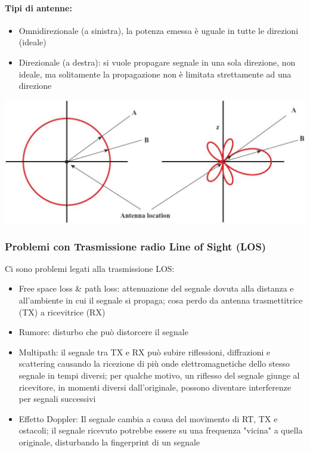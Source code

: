 \paragraph{Tipi di antenne:}
\begin{itemize}
	\item Omnidirezionale (a sinistra), la potenza emessa è uguale in tutte le direzioni (ideale)
	\item Direzionale (a destra): si vuole propagare segnale in una sola direzione, non ideale, ma solitamente la propagazione non è limitata strettamente ad una direzione
\end{itemize}
\begin{center}
	\includegraphics[width=0.9\linewidth]{img/wireless/antenna}
\end{center}

\newpage

\subsubsection{Problemi con Trasmissione radio Line of Sight (LOS)}

Ci sono problemi legati alla trasmissione LOS:
\begin{itemize}
	\item Free space loss \& path loss: attenuazione del segnale dovuta alla distanza e all'ambiente in cui il segnale si propaga; cosa perdo da antenna trasmettitrice (TX) a ricevitrice (RX)
	\item Rumore: disturbo che può distorcere il segnale
	\item Multipath: il segnale tra TX e RX può subire riflessioni, diffrazioni e scattering causando la ricezione di più onde elettromagnetiche dello stesso segnale in tempi diversi; per qualche motivo, un riflesso del segnale giunge al ricevitore, in momenti diversi dall'originale, possono diventare interferenze per segnali successivi
	\item Effetto Doppler: Il segnale cambia a causa del movimento di RT, TX e ostacoli; il segnale ricevuto potrebbe essere su una frequenza "vicina" a quella originale, disturbando la fingerprint di un segnale
\end{itemize}

